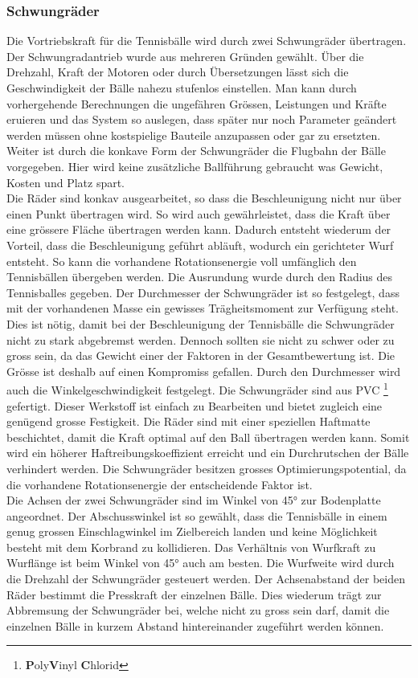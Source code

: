 \subsubsection{Schwungräder}
Die Vortriebskraft für die Tennisbälle wird durch zwei Schwungräder übertragen. Der Schwungradantrieb wurde aus mehreren Gründen gewählt. Über die Drehzahl, Kraft der Motoren oder durch Übersetzungen lässt sich die Geschwindigkeit der Bälle nahezu stufenlos einstellen. Man kann durch vorhergehende Berechnungen die ungefähren Grössen, Leistungen und Kräfte eruieren und das System so auslegen, dass später nur noch Parameter geändert werden müssen ohne kostspielige Bauteile anzupassen oder gar zu ersetzten. Weiter ist durch die konkave Form der Schwungräder die Flugbahn der Bälle vorgegeben. Hier wird keine zusätzliche Ballführung gebraucht was Gewicht, Kosten und Platz spart. \\
Die Räder sind konkav ausgearbeitet, so dass die Beschleunigung nicht nur über einen Punkt übertragen wird. So wird auch gewährleistet, dass die Kraft über eine grössere Fläche übertragen werden kann. Dadurch entsteht wiederum der Vorteil, dass die Beschleunigung geführt abläuft, wodurch ein gerichteter Wurf entsteht. So kann die vorhandene Rotationsenergie voll umfänglich den Tennisbällen übergeben werden. Die Ausrundung wurde durch den Radius des Tennisballes gegeben. Der Durchmesser der Schwungräder ist so festgelegt, dass mit der vorhandenen Masse ein gewisses Trägheitsmoment zur Verfügung steht. Dies ist nötig, damit bei der Beschleunigung der Tennisbälle die Schwungräder nicht zu stark abgebremst werden. Dennoch sollten sie nicht zu schwer oder zu gross sein, da das Gewicht einer der Faktoren in der Gesamtbewertung ist. Die Grösse ist deshalb auf einen Kompromiss gefallen. Durch den Durchmesser wird auch die Winkelgeschwindigkeit festgelegt. Die Schwungräder sind aus PVC \footnote{\textbf{P}oly\textbf{V}inyl \textbf{C}hlorid} gefertigt. Dieser Werkstoff ist einfach zu Bearbeiten und bietet zugleich eine genügend grosse Festigkeit. Die Räder sind mit einer speziellen Haftmatte beschichtet, damit die Kraft optimal auf den Ball übertragen werden kann. Somit wird ein höherer Haftreibungskoeffizient erreicht und ein Durchrutschen der Bälle verhindert werden. Die Schwungräder besitzen grosses Optimierungspotential, da die vorhandene Rotationsenergie der entscheidende Faktor ist.\\
Die Achsen der zwei Schwungräder sind im Winkel von 45° zur Bodenplatte angeordnet. Der Abschusswinkel ist so gewählt, dass die Tennisbälle in einem genug grossen Einschlagwinkel im Zielbereich landen und keine Möglichkeit besteht mit dem Korbrand zu kollidieren. Das Verhältnis von Wurfkraft zu Wurflänge ist beim Winkel von 45° auch am besten. Die Wurfweite wird durch die Drehzahl der Schwungräder gesteuert werden. Der Achsenabstand der beiden Räder bestimmt die Presskraft der einzelnen Bälle. Dies wiederum trägt zur Abbremsung der Schwungräder bei, welche nicht zu gross sein darf, damit die einzelnen Bälle in kurzem Abstand hintereinander zugeführt werden können. 
